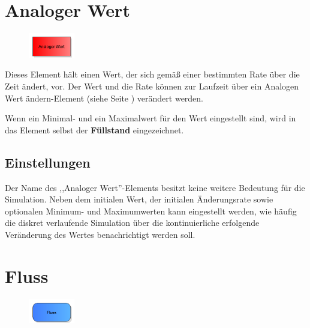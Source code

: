 \section{Analoger Wert}
\label{ref:ModelElementAnalogValue}

\begin{figure}
\vspace{-22pt}
\includegraphics[width=2cm]{imageModelElementAnalogValue.png}
\vspace{-22pt}
\end{figure}

Dieses Element hält einen Wert, der sich gemäß einer bestimmten Rate über die Zeit ändert, vor.
Der Wert und die Rate können zur Laufzeit über ein
Analogen Wert ändern-Element (siehe Seite \pageref{ref:ModelElementAnalogAssign}) verändert werden.

Wenn ein Minimal- und ein Maximalwert für den Wert eingestellt sind, wird in das Element
selbst der \textbf{Füllstand} eingezeichnet.

\subsection*{Einstellungen}

Der Name des ,,Analoger Wert''-Elements besitzt keine weitere Bedeutung für die Simulation.
Neben dem initialen Wert, der initialen Änderungsrate sowie optionalen Minimum- und Maximumwerten
kann eingestellt werden, wie häufig die diskret verlaufende Simulation über die kontinuierliche
erfolgende Veränderung des Wertes benachrichtigt werden soll.


\section{Fluss}
\label{ref:ModelElementTankFlowByClient}

\begin{figure}
\vspace{-22pt}
\includegraphics[width=2cm]{imageModelElementTankFlowByClient.png}
\vspace{-22pt}
\end{figure}


